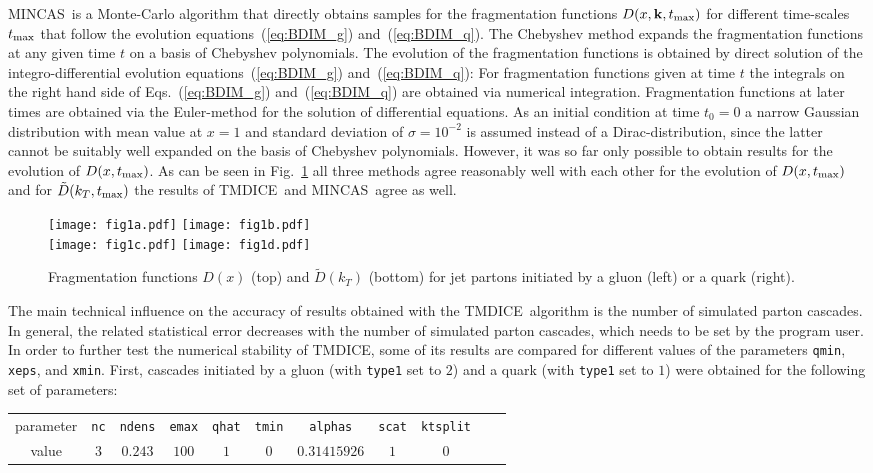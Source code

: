 \documentclass[preprint,12pt]{elsarticle}
\newcommand{\tmdice}{{\sf TMDICE}}
\newcommand{\mincas}{{\sf MINCAS}}
\begin{document}
\mincas~is a Monte-Carlo algorithm that directly obtains  samples for the fragmentation functions $D(x,\mathbf{k},t_{\rm max})$ for different time-scales $t_{\rm max}$ that follow the evolution equations~(\ref{eq:BDIM_g}) and~(\ref{eq:BDIM_q}). The Chebyshev method expands the fragmentation functions at any given time $t$ on a basis of Chebyshev polynomials. The evolution of the fragmentation functions is obtained by direct solution of the integro-differential evolution equations~(\ref{eq:BDIM_g}) and~(\ref{eq:BDIM_q}): For fragmentation functions given at time $t$ the integrals on the right hand side of Eqs.~(\ref{eq:BDIM_g}) and~(\ref{eq:BDIM_q}) are obtained via numerical integration. Fragmentation functions at later times are obtained via the Euler-method for the solution of differential equations. As an initial condition at time $t_0=0$ a narrow Gaussian distribution with mean value at $x=1$ and standard deviation of $\sigma=10^{-2}$ is assumed instead of a Dirac-distribution, since the latter cannot be suitably well expanded on the basis of Chebyshev polynomials. However, it was so far only possible to obtain results for the evolution of $D(x,t_{\rm max})$. As can be seen in Fig.~\ref{fig1} all three methods agree reasonably well with each other for the evolution of $D(x,t_{\rm max})$ and for $\tilde{D}(k_T,t_{\rm max})$ the results of \tmdice~and \mincas~agree as well.
 \begin{figure}
      \texttt{[image: fig1a.pdf]}
     \texttt{[image: fig1b.pdf]}\\
     \texttt{[image: fig1c.pdf]}
     \texttt{[image: fig1d.pdf]}
    \caption{Fragmentation functions $D(x)$ (top) and $\tilde{D}(k_T)$ (bottom) for jet partons initiated by a gluon (left) or a quark (right).}
     \label{fig1}
 \end{figure}
%
The main technical influence on the accuracy of results obtained with the \tmdice~algorithm is the number of simulated parton cascades. 
In general, the related statistical error decreases with the number of simulated parton cascades, which needs to be set by the program user.
In order to further test the numerical stability of \tmdice, some of its results are compared for different values of the parameters \verb#qmin#, \verb#xeps#, and \verb#xmin#. 
First, cascades initiated by a gluon (with \verb#type1# set to $2$) and a quark (with \verb#type1# set to $1$) were obtained for the following set of parameters:

%
\begin{tabular}{c|c|c|c|c|c|c|c|c|c|c|}
   parameter  &\verb#nc#&\verb#ndens#&\verb#emax#&\verb#qhat#&\verb#tmin#&\verb#alphas#&\verb#scat#&\verb#ktsplit# \\
    value & $3$&$0.243$&$100$&$1$&$0$&$0.31415926$&$1$&$0$
\end{tabular}
%
\end{document}
